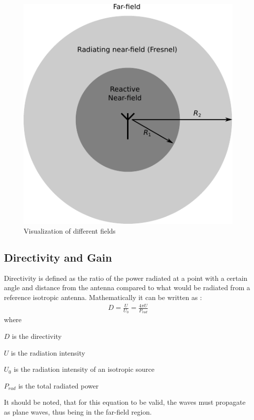 \begin{figure}[htbp]
  \centering
  \includegraphics[scale=1]{img/analysis/radiationfields}
  \caption{Visualization of different fields\cite{balanis2012antenna}}
  \label{fig:field-regions}
\end{figure}

\subsection{Directivity and Gain}
\label{subsec:dir_gain}
Directivity is defined as the ratio of the power radiated at a  point with a certain angle and distance from the antenna compared to what would be radiated from a reference isotropic antenna. Mathematically it can be written as \cite{}: 
\begin{align}
  D = \frac{U}{U_0} = \frac{4 \pi U}{P_{rad}} 
\end{align}
where
\begin{where}
  \item[$D$] is the directivity
  \item[$U$] is the radiation intensity
  \item[$U_0$] is the radiation intensity of an isotropic source
  \item[$P_{rad}$] is the total radiated power 
\end{where}
It should be noted, that for this equation to be valid, the waves must propagate as plane waves, thus being in the far-field region.


